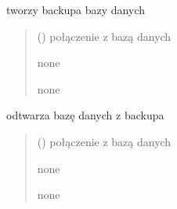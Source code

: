 \documentclass[letterpaper,10pt,polish]{sphinxmanual}
\begin{document}
\begin{fulllineitems}

\pysigstartsignatures
{}
\pysigstopsignatures
\sphinxAtStartPar
tworzy backupa bazy danych
\begin{quote}\begin{description}
\sphinxAtStartPar
{} () \textendash{} połączenie z bazą danych

\sphinxAtStartPar
none

\sphinxAtStartPar
none

\end{description}\end{quote}

\end{fulllineitems}



\begin{fulllineitems}

\pysigstartsignatures
{}
\pysigstopsignatures
\sphinxAtStartPar
odtwarza bazę danych z backupa
\begin{quote}\begin{description}
\sphinxAtStartPar
{} () \textendash{} połączenie z bazą danych

\sphinxAtStartPar
none

\sphinxAtStartPar
none

\end{description}\end{quote}

\end{fulllineitems}
\end{document}
